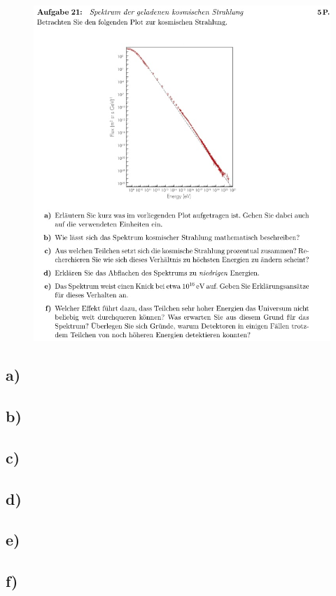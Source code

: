     \begin{figure}[H]
        \centering
        \includegraphics[width=\textwidth]{images/Aufgabe21.jpg}
        \label{fig:4}
    \end{figure}


\subsection{a)}

\subsection{b)}

\subsection{c)}

\subsection{d)}

\subsection{e)}

\subsection{f)}




